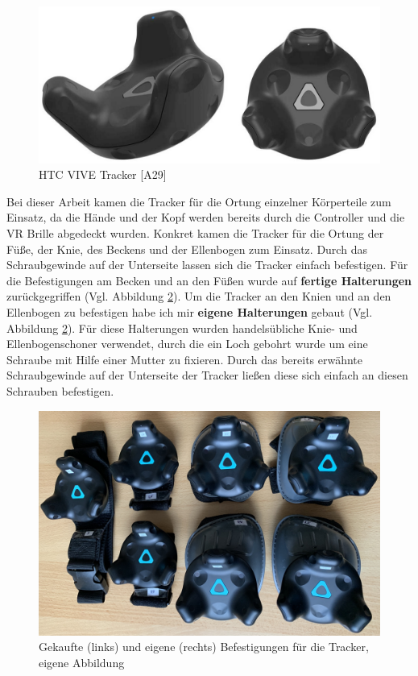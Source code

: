 \newline
\begin{figure}[h]
	\centering
	\includegraphics[width=0.5\linewidth]{Bilder/A29_ViveTracker}
	\caption{HTC VIVE Tracker [A29]}
	\label{fig:ViveTracker}
\end{figure}
\newline
Bei dieser Arbeit kamen die Tracker für die Ortung einzelner Körperteile zum Einsatz, da die Hände und der Kopf werden bereits durch die Controller und die VR Brille abgedeckt wurden. Konkret kamen die Tracker für die Ortung der Füße, der Knie, des Beckens und der Ellenbogen zum Einsatz. Durch das Schraubgewinde auf der Unterseite lassen sich die Tracker einfach befestigen. Für die Befestigungen am Becken und an den Füßen wurde auf \textbf{fertige Halterungen} zurückgegriffen (Vgl. Abbildung \ref{fig:Mounts}). Um die Tracker an den Knien und an den Ellenbogen zu befestigen habe ich mir \textbf{eigene Halterungen} gebaut (Vgl. Abbildung \ref{fig:Mounts}). Für diese Halterungen wurden handelsübliche Knie- und Ellenbogenschoner verwendet, durch die ein Loch gebohrt wurde um eine Schraube mit Hilfe einer Mutter zu fixieren. Durch das bereits erwähnte Schraubgewinde auf der Unterseite der Tracker ließen diese sich einfach an diesen Schrauben befestigen.
\begin{figure}[h]
	\centering
	\includegraphics[width=0.7\linewidth]{Bilder/A32_Mounts}
	\caption{Gekaufte (links) und eigene (rechts) Befestigungen für die Tracker, eigene Abbildung}
	\label{fig:Mounts}
\end{figure}

